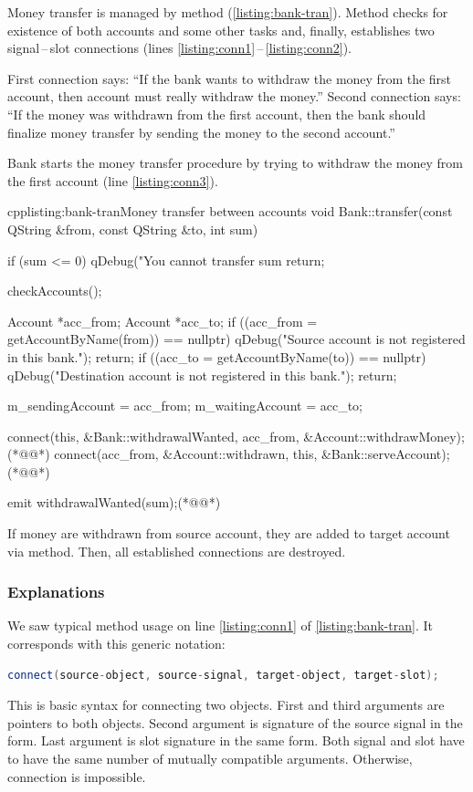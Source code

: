 Money transfer is managed by method (\autoref{listing:bank-tran}). Method checks for existence of both accounts and some other tasks and, finally, establishes two signal\,--\,slot connections (lines \ref{listing:conn1}\,--\,\ref{listing:conn2}).

First connection says: \enquote{If the bank wants to withdraw the money from the first account, then account must really withdraw the money.} Second connection says: \enquote{If the money was withdrawn from the first account, then the bank should finalize money transfer by sending the money to the second account.}

Bank starts the money transfer procedure by trying to withdraw the money from the first account (line \ref{listing:conn3}).

\begin{fdoccode}{cpp}{listing:bank-tran}{Money transfer between accounts}
void Bank::transfer(const QString &from, const QString &to, int sum) {
    if (sum <= 0) {
		qDebug("You cannot transfer sum %
		return;
    }

    checkAccounts();

    Account *acc_from;
    Account *acc_to;
    if ((acc_from = getAccountByName(from)) == nullptr) {
		qDebug("Source account is not registered in this bank.");
		return;
    }
    if ((acc_to = getAccountByName(to)) == nullptr) {
		qDebug("Destination account is not registered in this bank.");
		return;
    }

    m_sendingAccount = acc_from;
    m_waitingAccount = acc_to;

    connect(this, &Bank::withdrawalWanted, acc_from, &Account::withdrawMoney);(*@\label{listing:conn1}@*)
    connect(acc_from, &Account::withdrawn, this, &Bank::serveAccount);(*@\label{listing:conn2}@*)

    emit withdrawalWanted(sum);(*@\label{listing:conn3}@*)
}
\end{fdoccode}

If money are withdrawn from source account, they are added to target account via method. Then, all established connections are destroyed.

\subsubsection{Explanations}
We saw typical method usage on line \ref{listing:conn1} of \autoref{listing:bank-tran}. It corresponds with this generic notation:
\begin{lstlisting}[firstnumber=1,language=cpp]
connect(source-object, source-signal, target-object, target-slot);
\end{lstlisting}
This is basic syntax for connecting two objects. First and third arguments are pointers to both objects. Second argument is signature of the source signal in the form. Last argument is slot signature in the same form. Both signal and slot have to have the same number of mutually compatible arguments. Otherwise, connection is impossible.

